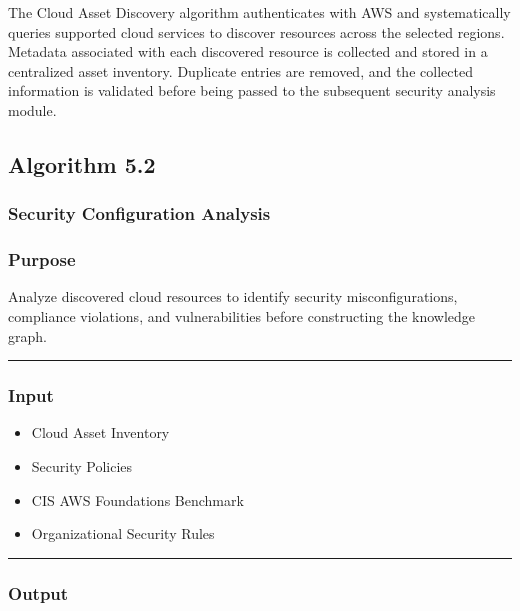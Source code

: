 The Cloud Asset Discovery algorithm authenticates with AWS and systematically queries supported cloud services to discover resources across the selected regions. Metadata associated with each discovered resource is collected and stored in a centralized asset inventory. Duplicate entries are removed, and the collected information is validated before being passed to the subsequent security analysis module.

\subsection{Algorithm 5.2}

\subsubsection{Security Configuration Analysis}

\subsubsection{\texorpdfstring{\textbf{Purpose}}{Purpose}}

Analyze discovered cloud resources to identify security misconfigurations, compliance violations, and vulnerabilities before constructing the knowledge graph.

\begin{center}\rule{0.5\linewidth}{0.5pt}\end{center}

\subsubsection{\texorpdfstring{\textbf{Input}}{Input}}

\begin{itemize}
\tightlist
\item
  Cloud Asset Inventory\\
\item
  Security Policies\\
\item
  CIS AWS Foundations Benchmark\\
\item
  Organizational Security Rules
\end{itemize}

\begin{center}\rule{0.5\linewidth}{0.5pt}\end{center}

\subsubsection{\texorpdfstring{\textbf{Output}}{Output}}

